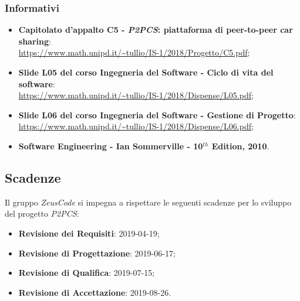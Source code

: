 \subsubsection{Informativi}
\begin{itemize}
	\item \textbf{Capitolato d'appalto C5 - \textit{P2PCS}: piattaforma di peer-to-peer car sharing}: \\
	\url{https://www.math.unipd.it/~tullio/IS-1/2018/Progetto/C5.pdf};
	\item \textbf{Slide L05 del corso Ingegneria del Software - Ciclo di vita 
		del software}:\\
	\url{https://www.math.unipd.it/~tullio/IS-1/2018/Dispense/L05.pdf};
	\item \textbf{Slide L06 del corso Ingegneria del Software - Gestione di 
	Progetto}: \\
	\url{https://www.math.unipd.it/~tullio/IS-1/2018/Dispense/L06.pdf};
	\item \textbf{Software Engineering - Ian Sommerville - 10$^{th}$ Edition, 
	2010}.
\end{itemize}

\hypertarget{scadenze}{\subsection{Scadenze}}
Il gruppo \textit{ZeusCode} si impegna a rispettare le seguenti scadenze per lo 
sviluppo del progetto \textit{P2PCS}:

\begin{itemize}
	\item \textbf{Revisione dei Requisiti}: 2019-04-19;
	\item \textbf{Revisione di Progettazione}: 2019-06-17;
	\item \textbf{Revisione di Qualifica}: 2019-07-15;
	\item \textbf{Revisione di Accettazione}: 2019-08-26.
\end{itemize}